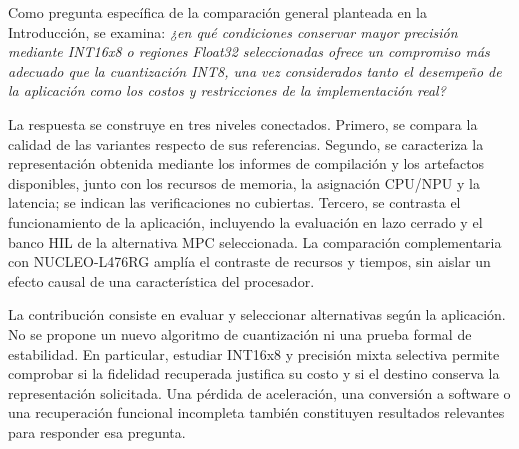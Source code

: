 Como pregunta específica de la comparación general planteada en la Introducción, se examina: \emph{¿en qué condiciones conservar mayor precisión mediante INT16x8 o regiones Float32 seleccionadas ofrece un compromiso más adecuado que la cuantización INT8, una vez considerados tanto el desempeño de la aplicación como los costos y restricciones de la implementación real?}

La respuesta se construye en tres niveles conectados. Primero, se compara la calidad de las variantes respecto de sus referencias. Segundo, se caracteriza la representación obtenida mediante los informes de compilación y los artefactos disponibles, junto con los recursos de memoria, la asignación CPU/NPU y la latencia; se indican las verificaciones no cubiertas. Tercero, se contrasta el funcionamiento de la aplicación, incluyendo la evaluación en lazo cerrado y el banco HIL de la alternativa MPC seleccionada. La comparación complementaria con NUCLEO-L476RG amplía el contraste de recursos y tiempos, sin aislar un efecto causal de una característica del procesador.

La contribución consiste en evaluar y seleccionar alternativas según la aplicación. No se propone un nuevo algoritmo de cuantización ni una prueba formal de estabilidad. En particular, estudiar INT16x8 y precisión mixta selectiva permite comprobar si la fidelidad recuperada justifica su costo y si el destino conserva la representación solicitada. Una pérdida de aceleración, una conversión a software o una recuperación funcional incompleta también constituyen resultados relevantes para responder esa pregunta.
